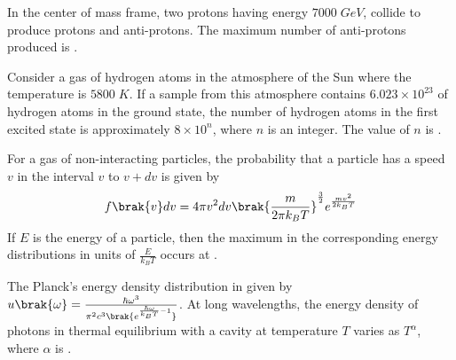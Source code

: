 \item In the center of mass frame, two protons having energy $7000\;GeV$, collide to produce protons and anti-protons. The maximum number of anti-protons produced is \underline{\hspace{2cm}}.\\ 
\item Consider a gas of hydrogen atoms in the atmosphere of the Sun where the temperature is $5800\;K$. If a sample from this atmosphere contains $6.023\times10^{23}$ of hydrogen atoms in the ground state, the number of hydrogen atoms in the first excited state is approximately $8\times 10^n$, where $n$ is an integer. The value of $n$ is \underline{\hspace{2cm}}.\\
\item For a gas of non-interacting particles, the probability that a particle has a speed $v$ in the interval $v$ to $v+dv$ is given by $$f\brak{v}dv=4\pi v^2dv\brak{\frac{m}{2\pi k_BT}}^{\frac{3}{2}}e^{\frac{mv^2}{2k_BT}}$$ If $E$ is the energy of a particle, then the maximum in the corresponding energy distributions in units of $\frac{E}{k_BT}$ occurs at \underline{\hspace{2cm}} .
\item The Planck's energy density distribution in given by $u\brak{\omega}=\frac{\hbar \omega^3}{\pi^2 c^3 \brak{e^{\frac{\hbar \omega}{k_BT}-1}}}$. At long wavelengths, the energy density of photons in thermal equilibrium with a cavity at temperature $T$ varies as $T^{\alpha}$, where $\alpha$ is \underline{\hspace{2cm}}.

